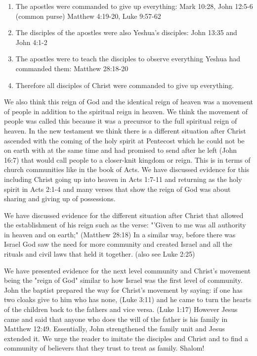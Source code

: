 \documentclass[11pt]{article}
\begin{document}
\begin{enumerate}
\item The apostles were commanded to give up everything: Mark 10:28, John 12:5-6 (common purse) Matthew 4:19-20, Luke 9:57-62 
\item The disciples of the apostles were also Yeshua's disciples: John 13:35 and John 4:1-2 
\item The apostles were to teach the disciples to observe everything Yeshua had commanded them: Matthew 28:18-20
\item Therefore all disciples of Christ were commanded to give up everything.
\end{enumerate}

We also think this reign of God and the identical reign of heaven was a movement of people in addition to the spiritual reign in heaven. We think the movement of people was called this because it was a precursor to the full spiritual reign of heaven. In the new testament we think there is a different situation after Christ ascended with the coming of the holy spirit at Pentecost which he could not be on earth with at the same time and had promised to send after he left (John 16:7) that would call people to a closer-knit kingdom or reign. This is in terms of church communities like in the book of Acts. We have discussed evidence for this including Christ going up into heaven in Acts 1:7-11 and returning as the holy spirit in Acts 2:1-4 and many verses that show the reign of God was about sharing and giving up of possessions.

We have discussed evidence for the different situation after Christ that allowed the establishment of his reign such as the verse: "'Given to me was all authority in heaven and on earth;" (Matthew 28:18) In a similar way, before there was Israel God saw the need for more community and created Israel and all the rituals and civil laws that held it together. (also see Luke 2:25)

We have presented evidence for the next level community and Christ's movement being the "reign of God" similar to how Israel was the first level of community. John the baptist prepared the way for Christ's movement by saying: if one has two cloaks give to him who has none, (Luke 3:11) and he came to turn the hearts of the children back to the fathers and vice versa. (Luke 1:17) However Jesus came and said that anyone who does the will of the father is his family in Matthew 12:49. Essentially, John strengthened the family unit and Jesus extended it. We urge the reader to imitate the disciples and Christ and to find a community of believers that they trust to treat as family. Shalom! 
\end{document}
